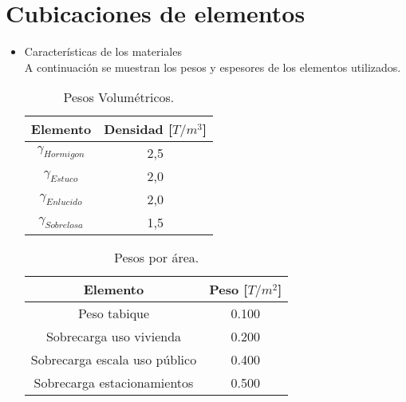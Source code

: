 \documentclass[letterpaper,11pt]{article} %
\begin{document}
\section{Cubicaciones de elementos}
    \begin{itemize}
        \item Características de los materiales \\
        A continuación se muestran los pesos  y espesores de los elementos utilizados.
         
            \begin{table}[H]
              \centering
              \caption{Pesos Volumétricos.}
                \begin{tabular}{|c|c|}
                \hline
                \textbf{Elemento} &
                  \boldmath{}\textbf{Densidad [$T/m^3$]}\unboldmath{}
                  \bigstrut\\
                \hline
                $\gamma_{Hormigon}$ &
                  2,5
                  \bigstrut\\
                \hline
                $\gamma_{Estuco}$ &
                  2,0
                  \bigstrut\\
                \hline
                $\gamma_{Enlucido}$ &
                  2,0
                  \bigstrut\\
                \hline
                $\gamma_{Sobrelosa}$ &
                  1,5
                  \bigstrut\\
                \hline
                \end{tabular}%
              \label{volumen}%
            \end{table}%

            \begin{table}[H]
              \centering
              \caption{Pesos por área.}
                \begin{tabular}{|c|c|}
                \hline
                \textbf{Elemento} & \boldmath{}\textbf{Peso [$T/m^2$]}\unboldmath{} \bigstrut\\
                \hline
                Peso tabique & 0.100 \bigstrut\\
                \hline
                Sobrecarga uso vivienda & 0.200 \bigstrut\\
                \hline
                Sobrecarga escala uso público & 0.400 \bigstrut\\
                \hline
                Sobrecarga estacionamientos & 0.500 \bigstrut\\
                \hline
                \end{tabular}%
              \label{Area}%
            \end{table}


\end{itemize}
\end{document}

